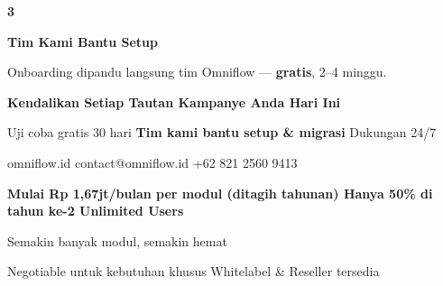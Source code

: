 \documentclass[a4paper]{article}
\begin{document}
\begin{center}
\begin{minipage}[t]{0.318\textwidth}
{\begin{minipage}[t][4.7cm][c]{\dimexpr\linewidth-2\fboxsep\relax}
            \begin{center}
                {\fontsize{22}{26}\selectfont\bfseries\color{BluePrimary} 3}
            \end{center}
            \vspace{2pt}
            \begin{center}
                {\fontsize{10}{13}\selectfont\bfseries\color{BlueDark} Tim Kami Bantu Setup}\par\vspace{3pt}
                {\fontsize{9}{12}\selectfont\color{TextDark} Onboarding dipandu langsung tim Omniflow --- \textbf{gratis}, 2--4 minggu.}
            \end{center}
        \end{minipage}}
\end{minipage}
\end{center}

\vspace{8pt}

{\setlength{\fboxsep}{10pt}\setlength{\fboxrule}{0pt}%
\noindent\colorbox{BluePrimary}{%
    \begin{minipage}{\dimexpr\textwidth-2\fboxsep\relax}
        \centering
        {\fontsize{13}{16}\selectfont\bfseries\color{White}
        Kendalikan Setiap Tautan Kampanye Anda Hari Ini}\par\vspace{3pt}
        {\fontsize{9.5}{12}\selectfont\color{BlueMid}
        Uji coba gratis 30 hari \enspace\textbullet\enspace \textbf{Tim kami bantu setup \& migrasi} \enspace\textbullet\enspace Dukungan 24/7}\par\vspace{2pt}
        {\fontsize{9.5}{12}\selectfont\color{BlueLight}
        omniflow.id \enspace\textbullet\enspace contact@omniflow.id \enspace\textbullet\enspace +62 821 2560 9413}
    \end{minipage}}}


\vspace{6pt}

{\setlength{\fboxsep}{8pt}\setlength{\fboxrule}{0pt}%
\noindent\colorbox{BlueBg}{%
    \begin{minipage}{\dimexpr\textwidth-2\fboxsep\relax}
        \centering
        {\fontsize{9}{12}\selectfont\bfseries\color{BluePrimary}
        Mulai Rp 1,67jt/bulan per modul (ditagih tahunan) \enspace\textbullet\enspace Hanya 50\% di tahun ke-2 \enspace\textbullet\enspace Unlimited Users}\par\vspace{1pt}
        {\fontsize{8.5}{11}\selectfont\color{BlueDark}
        Semakin banyak modul, semakin hemat}\par\vspace{1pt}
        {\fontsize{8}{10}\selectfont\color{TextLight}
        Negotiable untuk kebutuhan khusus \enspace\textbullet\enspace Whitelabel \& Reseller tersedia}
    \end{minipage}}}

\restoregeometry
\pagestyle{empty}
\end{document}
